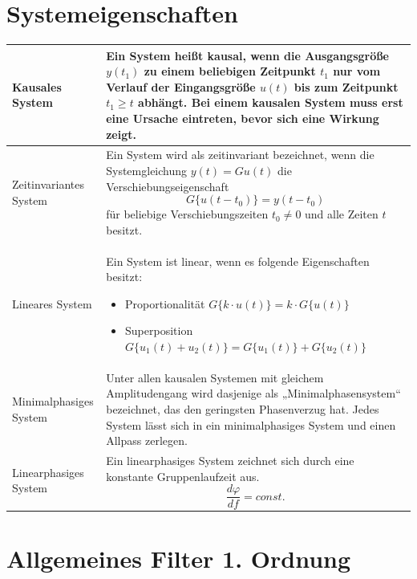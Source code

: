 \documentclass[a4paper, 12pt]{report}
\begin{document}
\clearpage

\section*{Systemeigenschaften}

	\begin{tabular}{|p{5cm}|p{9cm}|}
	\hline Kausales System &  Ein System heißt kausal, wenn die Ausgangsgröße $ y(t_1) $ zu einem beliebigen Zeitpunkt $ t_1 $ nur
	vom Verlauf der Eingangsgröße $ u(t) $ bis zum Zeitpunkt $ t_1 \ge t $ abhängt. Bei einem kausalen System muss erst eine Ursache eintreten, bevor sich eine Wirkung zeigt. \\
	\hline Zeitinvariantes System & Ein System wird als zeitinvariant bezeichnet, wenn die Systemgleichung $ y(t) = Gu(t) $ die Verschiebungseigenschaft
	\[ G\{u(t-t_0)\} = y(t-t_0) \]
	für beliebige Verschiebungszeiten $ t_0 \ne 0 $ und alle Zeiten $ t $ besitzt. \\ 
	\hline Lineares System & Ein System ist linear, wenn es folgende Eigenschaften besitzt:
		\begin{itemize}
		\itemsep 0 em
		\parskip 0 em
		\item Proportionalität $ G\{k \cdot u(t)\} = k \cdot G\{ u(t) \} $
		\item Superposition \newline $ G\{u_1(t) + u_2(t) \} = G\{ u_1(t) \} + G\{ u_2(t) \} $
		\end{itemize} \\ 
	\hline Minimalphasiges System & Unter allen kausalen Systemen mit gleichem Amplitudengang wird
	dasjenige als „Minimalphasensystem“ bezeichnet, das den geringsten
	Phasenverzug hat. \newline Jedes System lässt sich in ein minimalphasiges System und einen Allpass zerlegen. \\ 
	\hline Linearphasiges System & Ein linearphasiges System zeichnet sich durch eine konstante Gruppenlaufzeit aus. \[ \frac{d\varphi}{df} = const. \] \\ 
	\hline
	\end{tabular}
	
\clearpage

\section*{Allgemeines Filter 1. Ordnung}

	\vspace{0.5cm}
\end{document}
